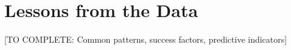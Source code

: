 \section{Lessons from the Data}

[TO COMPLETE: Common patterns, success factors, predictive indicators]